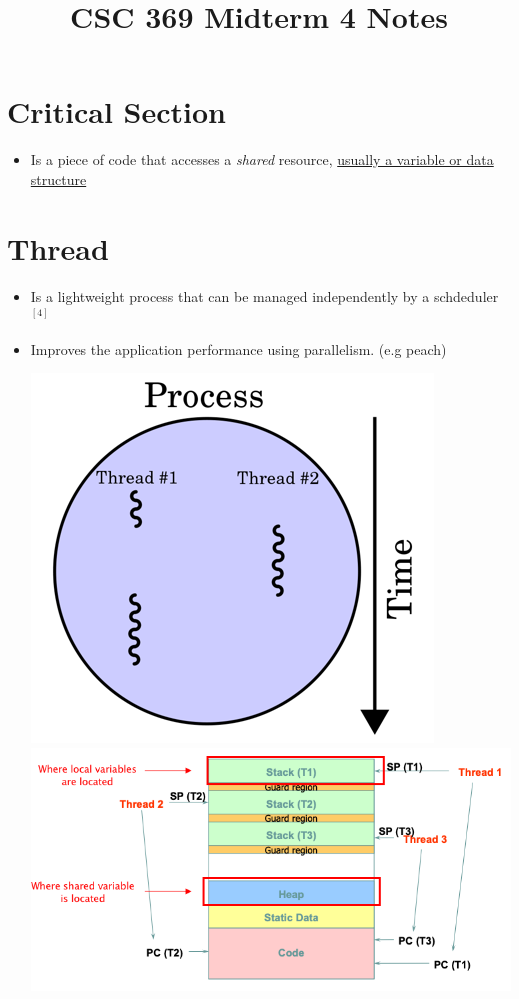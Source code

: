 \documentclass[12pt]{article}
\begin{document}
\title{CSC 369 Midterm 4 Notes}

\section{Critical Section}

\begin{itemize}
    \item Is a piece of code that accesses a \textit{shared} resource,
    \ul{usually a variable or data structure}
\end{itemize}

\section{Thread}

\begin{itemize}
    \item Is a lightweight process that can be managed independently by a schdeduler $^{[4]}$
    \item Improves the application performance using parallelism. (e.g peach)

    \begin{center}
    \includegraphics[width=0.4\linewidth]{../images/midterm_2_solution_1.png}
    \includegraphics[width=\linewidth]{../images/midterm_2_solution_2.png}
    \end{center}


\end{itemize}
\end{document}
